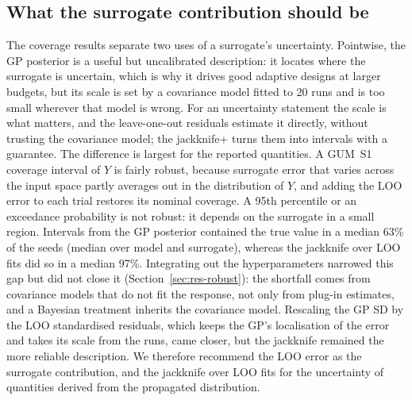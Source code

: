 \subsection{What the surrogate contribution should be}
The coverage results separate two uses of a surrogate's uncertainty.
Pointwise, the GP posterior is a useful but uncalibrated description: it
locates where the surrogate is uncertain, which is why it drives good
adaptive designs at larger budgets, but its scale is set by a covariance
model fitted to 20 runs and is too small wherever that model is wrong. For
an uncertainty statement the scale is what matters, and the leave-one-out
residuals estimate it directly, without trusting the covariance model; the
jackknife+ turns them into intervals with a guarantee. The difference is
largest for the reported quantities. A GUM~S1 coverage interval of $Y$ is
fairly robust, because surrogate error that varies across the input space
partly averages out in the distribution of $Y$, and adding the LOO error
to each trial restores its nominal coverage. A 95th percentile or an
exceedance probability is not robust: it depends on the surrogate in a
small region. Intervals from the GP posterior contained the true value in
a median 63\% of the seeds (median over model and surrogate), whereas the
jackknife over LOO fits did so in a median 97\%. Integrating out the
hyperparameters narrowed this gap but did not close it
(Section~\ref{sec:res-robust}): the shortfall comes from covariance models
that do not fit the response, not only from plug-in estimates, and a
Bayesian treatment inherits the covariance model. Rescaling the GP SD by the
LOO standardised residuals, which keeps the GP's localisation of the error
and takes its scale from the runs, came closer, but the jackknife remained
the more reliable description. We therefore recommend the LOO error as the
surrogate contribution, and the jackknife over LOO fits for the uncertainty
of quantities derived from the propagated distribution.


